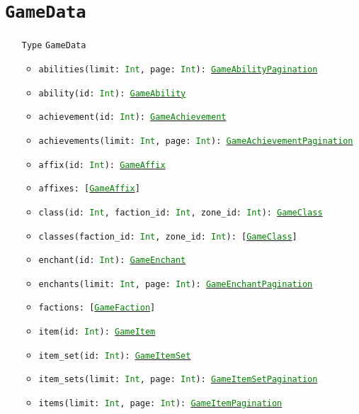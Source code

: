 \documentclass[10pt, a4paper]{memoir}
\numberwithin{equation}{section}
\theoremstyle{plain}
\theoremstyle{defp}
\theoremstyle{dotless}
\theoremstyle{definition}
\theoremstyle{dotless}
\theoremstyle{dotless}
\theoremstyle{defp}
\theoremstyle{defp}
\theoremstyle{be}          %
\theoremstyle{defp}
\newcommand\ttt[1]{\texttt{#1}}
\newcommand\type[1]{\ttt{\textcolor{green}{#1}}}
\begin{document}
\newpage

\section{\ttt{GameData}}\label{sec:GameData}

\begin{itemize}[noitemsep,topsep=1pt]
\item[\ttt{Type}] \ttt{GameData}
\begin{itemize}[itemsep=1pt,topsep=1pt]
\item \ttt{abilities(limit: \type{Int}, page: \type{Int}): \hyperref[sec:gameabilitypagination]{\type{GameAbilityPagination}}}
\item \ttt{ability(id: \type{Int}): \hyperref[sec:GameAbility]{\type{GameAbility}}}
\item \ttt{achievement(id: \type{Int}): \hyperref[sec:GameAchievement]{\type{GameAchievement}}}
\item \ttt{achievements(limit: \type{Int}, page: \type{Int}): \hyperref[sec:gameachievementpagination]{\type{GameAchievementPagination}}}
\item \ttt{affix(id: \type{Int}): \hyperref[sec:GameAffix]{\type{GameAffix}}}
\item \ttt{affixes: [\hyperref[sec:GameAffix]{\type{GameAffix}}]}
\item \ttt{class(id: \type{Int}, faction\_id: \type{Int}, zone\_id: \type{Int}): \hyperref[sec:GameClass]{\type{GameClass}}}
\item \ttt{classes(faction\_id: \type{Int}, zone\_id: \type{Int}): [\hyperref[sec:GameClass]{\type{GameClass}}]}
\item \ttt{enchant(id: \type{Int}): \hyperref[sec:GameEnchant]{\type{GameEnchant}}}
\item \ttt{enchants(limit: \type{Int}, page: \type{Int}): \hyperref[sec:gameenchantpagination]{\type{GameEnchantPagination}}}
\item \ttt{factions: [\hyperref[sec:GameFaction]{\type{GameFaction}}]}
\item \ttt{item(id: \type{Int}): \hyperref[sec:GameItem]{\type{GameItem}}}
\item \ttt{item\_set(id: \type{Int}): \hyperref[sec:GameItemSet]{\type{GameItemSet}}}
\item \ttt{item\_sets(limit: \type{Int}, page: \type{Int}): \hyperref[sec:gameitemsetpagination]{\type{GameItemSetPagination}}}
\item \ttt{items(limit: \type{Int}, page: \type{Int}): \hyperref[sec:gameitempagination]{\type{GameItemPagination}}}

\end{itemize}
\end{itemize}
\end{document}
